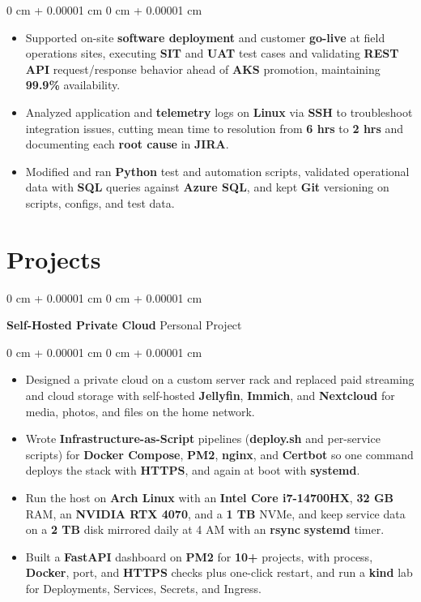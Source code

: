 \documentclass[10pt, letterpaper]{article}
\newenvironment{highlights}{
    \begin{itemize}[
        topsep=0.02 cm,
        parsep=0.02 cm,
        partopsep=0pt,
        itemsep=0pt,
        leftmargin=0 cm + 10pt
    ]
}{
    \end{itemize}
} %
\newenvironment{onecolentry}{
    \begin{adjustwidth}{
        0 cm + 0.00001 cm
    }{
        0 cm + 0.00001 cm
    }
}{
    \end{adjustwidth}
} %
\newcommand{\resumeheading}[2]{%
    \begin{onecolentry}
        #1 \hfill #2
    \end{onecolentry}
} %
\begin{document}
\begin{onecolentry}
\begin{highlights}
	\item Supported on-site \textbf{software deployment} and customer \textbf{go-live} at field operations sites, executing \textbf{SIT} and \textbf{UAT} test cases and validating \textbf{REST API} request/response behavior ahead of \textbf{AKS} promotion, maintaining \textbf{99.9\%} availability.
	\item Analyzed application and \textbf{telemetry} logs on \textbf{Linux} via \textbf{SSH} to troubleshoot integration issues, cutting mean time to resolution from \textbf{6 hrs} to \textbf{2 hrs} and documenting each \textbf{root cause} in \textbf{JIRA}.
	\item Modified and ran \textbf{Python} test and automation scripts, validated operational data with \textbf{SQL} queries against \textbf{Azure SQL}, and kept \textbf{Git} versioning on scripts, configs, and test data.
\end{highlights}
\end{onecolentry}


\section{Projects}

\resumeheading{\textbf{Self-Hosted Private Cloud}}{Personal Project}

\begin{onecolentry}
\begin{highlights}
	\item Designed a private cloud on a custom server rack and replaced paid streaming and cloud storage with self-hosted \textbf{Jellyfin}, \textbf{Immich}, and \textbf{Nextcloud} for media, photos, and files on the home network.
	\item Wrote \textbf{Infrastructure-as-Script} pipelines (\textbf{deploy.sh} and per-service scripts) for \textbf{Docker Compose}, \textbf{PM2}, \textbf{nginx}, and \textbf{Certbot} so one command deploys the stack with \textbf{HTTPS}, and again at boot with \textbf{systemd}.
	\item Run the host on \textbf{Arch Linux} with an \textbf{Intel Core i7-14700HX}, \textbf{32 GB} RAM, an \textbf{NVIDIA RTX 4070}, and a \textbf{1 TB} NVMe, and keep service data on a \textbf{2 TB} disk mirrored daily at 4 AM with an \textbf{rsync} \textbf{systemd} timer.
	\item Built a \textbf{FastAPI} dashboard on \textbf{PM2} for \textbf{10+} projects, with process, \textbf{Docker}, port, and \textbf{HTTPS} checks plus one-click restart, and run a \textbf{kind} lab for Deployments, Services, Secrets, and Ingress.
\end{highlights}
\end{onecolentry}
\end{document}
